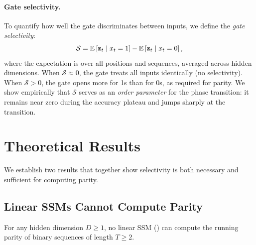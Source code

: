 \documentclass[11pt]{article}
\newcommand{\sel}{\mathcal{S}}
\begin{document}
\paragraph{Gate selectivity.}
To quantify how well the gate discriminates between inputs, we define the \emph{gate selectivity}:
\begin{equation}
    \label{eq:selectivity}
    \sel = \E\sb{\zz_t \mid x_t = 1} - \E\sb{\zz_t \mid x_t = 0},
\end{equation}
where the expectation is over all positions and sequences, averaged across hidden dimensions.
When $\sel \approx 0$, the gate treats all inputs identically (no selectivity).
When $\sel > 0$, the gate opens more for 1s than for 0s, as required for parity.
We show empirically that $\sel$ serves as an \emph{order parameter} for the phase transition: it remains near zero during the accuracy plateau and jumps sharply at the transition.

\section{Theoretical Results}
\label{sec:theory}

We establish two results that together show selectivity is both necessary and sufficient for computing parity.

\subsection{Linear SSMs Cannot Compute Parity}

\begin{theorem}
\label{thm:linear-impossible}
For any hidden dimension $D \geq 1$, no linear SSM () can compute the running parity of binary sequences of length $T \geq 2$.
\end{theorem}
\end{document}
